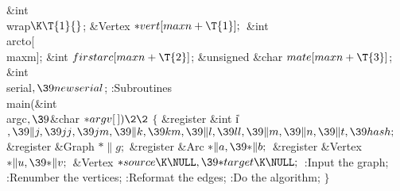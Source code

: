 \&{int} \\{wrap}${}\K\T{1}{}$;\6
\&{Vertex} ${}{*}\\{vert}[\\{maxn}+\T{1}];{}$\6
\&{int} \\{arcto}[\\{maxm}];\6
\&{int} ${}\\{firstarc}[\\{maxn}+\T{2}]{}$;\6
\&{unsigned} \&{char} ${}\\{mate}[\\{maxn}+\T{3}]{}$;\6
\&{int} \\{serial}${},\39\\{newserial}{}$;\7
\*:Subroutines\X\7
\1\1\\{main}(\&{int} \\{argc}${},\39{}$\&{char} ${}{*}\\{argv}[\,])\2\2{}$\6
${}\{{}$\1\6
\&{register} \&{int} \|i${},\39\|j,\39\\{jj},\39\\{jm},\39\|k,\39\\{km},\39\|l,%
\39\\{ll},\39\|m,\39\|n,\39\|t,\39\\{hash};{}$\6
\&{register} \&{Graph} ${}{*}\|g;{}$\6
\&{register} \&{Arc} ${}{*}\|a,\39{*}\|b;{}$\6
\&{register} \&{Vertex} ${}{*}\|u,\39{*}\|v;{}$\6
\&{Vertex} ${}{*}\\{source}\K\NULL,\39{*}\\{target}\K\NULL;{}$\7
:Input the graph\X;\6
:Renumber the vertices\X;\6
:Reformat the edges\X;\6
:Do the algorithm\X;\6
\4${}\}{}$\2\par
\fi

